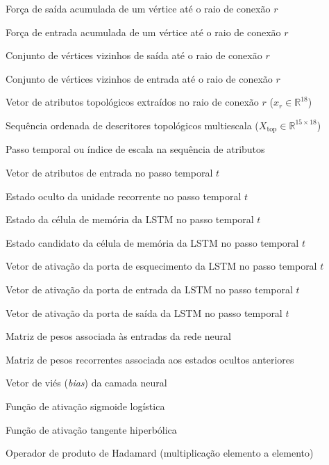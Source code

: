 \documentclass[
  12pt,		
  a4paper,	
  openright,  
  oneside,	
  chapter=TITLE,		
  section=TITLE,		
  english,	
  french,	    
  spanish,	
  brazil	    
]{abntex2}
\begin{document}
\begin{simbolos}
        \item[$\text{force}_{\mathrm{out}}$] Força de saída acumulada de um vértice até o raio de conexão $r$
        \item[$\text{force}_{\mathrm{in}}$] Força de entrada acumulada de um vértice até o raio de conexão $r$
        \item[$\mathcal{N}_{\mathrm{out}}$] Conjunto de vértices vizinhos de saída até o raio de conexão $r$
        \item[$\mathcal{N}_{\mathrm{in}}$] Conjunto de vértices vizinhos de entrada até o raio de conexão $r$
        \item[$x_r$] Vetor de atributos topológicos extraídos no raio de conexão $r$ ($x_r \in \mathbb{R}^{18}$)
        \item[$X_{\mathrm{top}}$] Sequência ordenada de descritores topológicos multiescala ($X_{\mathrm{top}} \in \mathbb{R}^{15 \times 18}$)
        \item[$t$] Passo temporal ou índice de escala na sequência de atributos
        \item[$x_t$] Vetor de atributos de entrada no passo temporal $t$
        \item[$h_t$] Estado oculto da unidade recorrente no passo temporal $t$
        \item[$c_t$] Estado da célula de memória da LSTM no passo temporal $t$
        \item[$\tilde{c}_t$] Estado candidato da célula de memória da LSTM no passo temporal $t$
        \item[$f_t$] Vetor de ativação da porta de esquecimento da LSTM no passo temporal $t$
        \item[$i_t$] Vetor de ativação da porta de entrada da LSTM no passo temporal $t$
        \item[$o_t$] Vetor de ativação da porta de saída da LSTM no passo temporal $t$
        \item[$W$] Matriz de pesos associada às entradas da rede neural
        \item[$U$] Matriz de pesos recorrentes associada aos estados ocultos anteriores
        \item[$b$] Vetor de viés (\textit{bias}) da camada neural
        \item[$\sigma(\cdot)$] Função de ativação sigmoide logística
        \item[$\tanh(\cdot)$] Função de ativação tangente hiperbólica
        \item[$\odot$] Operador de produto de Hadamard (multiplicação elemento a elemento)

\end{simbolos}
\end{document}
